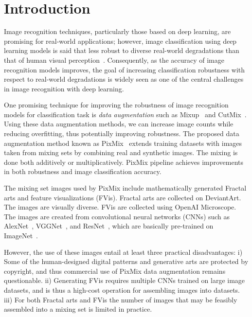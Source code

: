 \section{Introduction}
\label{sec:intro}


Image recognition techniques, particularly those based on deep learning, are promising for real-world applications; however, image classification using deep learning models is said that less robust to diverse real-world degradations than that of human visual perception~\cite{ImageNet-C,ImRobust}.
Consequently, as the accuracy of image recognition models improves, the goal of increasing classification robustness with respect to real-world degradations is widely seen as one of the central challenges in image recognition with deep learning.

One promising technique for improving the robustness of image recognition models for classification task is \textit{data augmentation} such as Mixup~\cite{Mixup} and CutMix~\cite{CutMix}.
Using these data augmentation methods, we can increase image counts while reducing overfitting, thus potentially improving robustness.
The proposed data augmentation method known as PixMix~\cite{PIXMIX} extends training datasets with images taken from mixing sets by combining real and synthetic images. The mixing is done both additively or multiplicatively. PixMix pipeline achieves improvements in both robustness and image classification accuracy.



The mixing set images used by PixMix include mathematically generated Fractal arts and feature visualizations (FVis).
Fractal arts are collected on DeviantArt. The images are visually diverse.
FVis are collected using OpenAI Microscope. The images are created from convolutional neural networks (CNNs) such as AlexNet~\cite{alexnet}, VGGNet~\cite{vggnet}, and ResNet~\cite{resnet}, which are basically pre-trained on ImageNet~\cite{distill,FVis}.

However, the use of these images entail at least three practical disadvantages:
i) Some of the human-designed digital patterns and generative arts
are protected by copyright, and thus commercial use of PixMix
data augmentation remains questionable.
ii) Generating FVis requires multiple CNNs trained on large image
datasets, and is thus a high-cost operation for assembling images into datasets.
iii) For both Fractal arts and FVis the number of
images that may be feasibly assembled into a mixing set is limited in practice.

